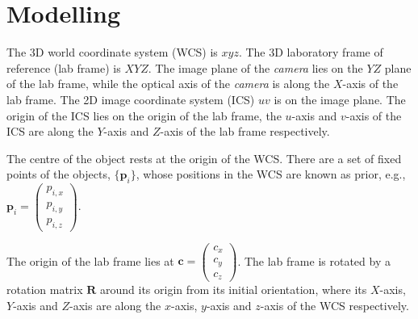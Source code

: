 \documentclass{article}
\renewcommand{\vec}[1]{\mathbf{#1}}
\begin{document}
\section{Modelling}
The 3D world coordinate system (WCS) is $xyz$.
The 3D laboratory frame of reference (lab frame) is $XYZ$.
The image plane of the \emph{camera} lies on the $YZ$ plane of the lab frame,
while the optical axis of the \emph{camera} is along the $X$-axis of the lab frame.
The 2D image coordinate system (ICS) $uv$ is on the image plane.
The origin of the ICS lies on the origin of the lab frame,
the $u$-axis and $v$-axis of the ICS are along the $Y$-axis and $Z$-axis of the lab frame respectively.

The centre of the object rests at the origin of the WCS.
There are a set of fixed points of the objects, $\{\vec{p}_i\}$, whose positions in the WCS are known as prior, e.g.,
$\vec{p}_i = \begin{pmatrix}p_{i,x} \\ p_{i,y} \\ p_{i,z} \end{pmatrix}$.

The origin of the lab frame lies at $\vec{c} = \begin{pmatrix}c_x \\ c_y \\ c_z \end{pmatrix}$.
The lab frame is rotated by a rotation matrix $\vec{R}$ around its origin from its initial orientation,
where its $X$-axis, $Y$-axis and $Z$-axis are along the $x$-axis, $y$-axis and $z$-axis of the WCS respectively.
\end{document}

